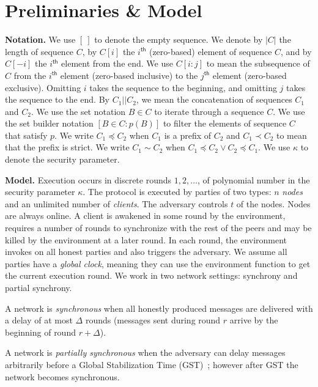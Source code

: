 \section{Preliminaries \& Model}\label{sec:prelims}

\noindent
\textbf{Notation.}
We use $[~]$ to denote the empty sequence.
We denote by $|C|$ the length of sequence $C$,
by $C[i]$ the $i^{\textsf{th}}$ (zero-based) element of
sequence $C$, and by $C[-i]$ the $i^{\textsf{th}}$ element
from the end. We use $C[i{:}j]$ to mean the subsequence
of $C$ from the $i^{\textsf{th}}$ element (zero-based inclusive)
to the $j^{\textsf{th}}$ element (zero-based exclusive).
Omitting $i$ takes the sequence to the beginning,
and omitting $j$ takes the sequence to the end.
By $C_1 || C_2$, we mean the concatenation
of sequences $C_1$ and $C_2$.
We use the set notation $B \in C$ to iterate
through a sequence $C$.
We use the set builder notation $[B \in C: p(B)]$
to filter the elements of sequence $C$ that satisfy $p$.
We write $C_1 \preccurlyeq C_2$ when $C_1$ is a prefix
of $C_2$ and $C_1 \prec C_2$ to mean that the prefix is strict.
We write $C_1 \sim C_2$ when
$C_1 \preccurlyeq C_2 \lor C_2 \preccurlyeq C_1$.
We use $\kappa$ to denote the security parameter.

\noindent
\textbf{Model.}
Execution occurs in discrete rounds $1, 2, \ldots$, of polynomial number in the
security parameter $\kappa$.
The protocol is executed by
parties of two types: $n$ \emph{nodes} and an unlimited number of \emph{clients}.
The adversary controls $t$ of the nodes.
Nodes are always online. A client is awakened in some round by the environment,
requires a number of rounds to synchronize with the rest of the peers and may be killed by
the environment at a later round.
In each round, the environment invokes \execute
on all honest parties and also triggers the adversary.
We assume all parties have a \emph{global clock}, meaning
they can use the environment function \now to get the current
execution round. We work in two network settings: synchrony and partial synchrony.

\begin{definition}[Synchrony]
  A network is \emph{synchronous} when
  all honestly produced messages are delivered with a delay of at most $\Delta$ rounds
  (messages sent during round $r$ arrive by the beginning of round $r + \Delta$).
\end{definition}

\begin{definition}
  A network is \emph{partially synchronous} when the adversary can delay
  messages arbitrarily before a Global Stabilization Time (GST)~\cite{dwork1988consensus}; however
  after GST the network becomes synchronous.
\end{definition}

